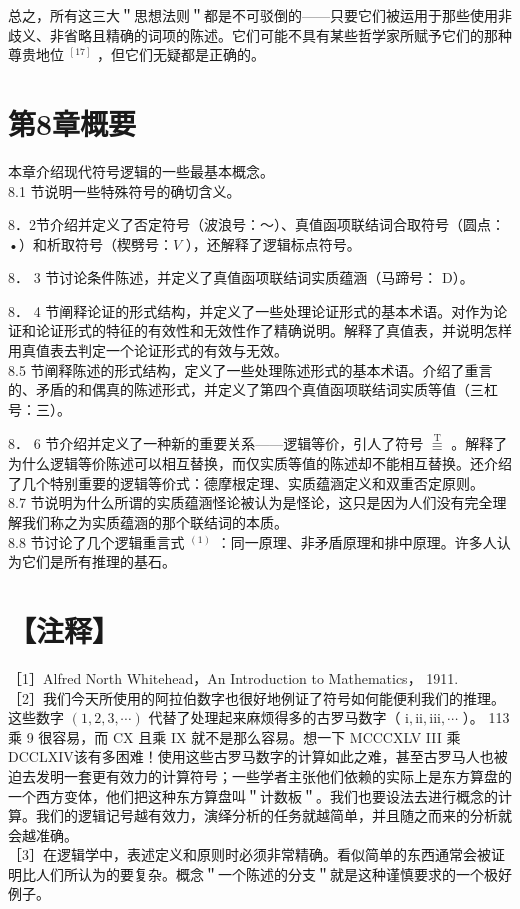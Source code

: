 总之，所有这三大＂思想法则＂都是不可驳倒的——只要它们被运用于那些使用非歧义、非省略且精确的词项的陈述。它们可能不具有某些哲学家所赋予它们的那种尊贵地位 ${ }^{[17]}$ ，但它们无疑都是正确的。

\section*{第8章概要}
本章介绍现代符号逻辑的一些最基本概念。\\
8.1 节说明一些特殊符号的确切含义。

8．2节介绍并定义了否定符号（波浪号：～）、真值函项联结词合取符号（圆点：•）和析取符号（楔劈号：$V$ ），还解释了逻辑标点符号。

8． 3 节讨论条件陈述，并定义了真值函项联结词实质蕴涵（马蹄号： D）。

8． 4 节阐释论证的形式结构，并定义了一些处理论证形式的基本术语。对作为论证和论证形式的特征的有效性和无效性作了精确说明。解释了真值表，并说明怎样用真值表去判定一个论证形式的有效与无效。\\
8.5 节阐释陈述的形式结构，定义了一些处理陈述形式的基本术语。介绍了重言的、矛盾的和偶真的陈述形式，并定义了第四个真值函项联结词实质等值（三杠号：三）。

8． 6 节介绍并定义了一种新的重要关系——逻辑等价，引人了符号 $\stackrel{\mathrm{T}}{\equiv}$ 。解释了为什么逻辑等价陈述可以相互替换，而仅实质等值的陈述却不能相互替换。还介绍了几个特别重要的逻辑等价式：德摩根定理、实质蕴涵定义和双重否定原则。\\
8.7 节说明为什么所谓的实质蕴涵怪论被认为是怪论，这只是因为人们没有完全理解我们称之为实质蕴涵的那个联结词的本质。\\
8.8 节讨论了几个逻辑重言式 ${ }^{(1)}$ ：同一原理、非矛盾原理和排中原理。许多人认为它们是所有推理的基石。

\section*{【注释】}
［1］Alfred North Whitehead，An Introduction to Mathematics， 1911.\\
［2］我们今天所使用的阿拉伯数字也很好地例证了符号如何能便利我们的推理。这些数字 $(1,2,3, \cdots)$ 代替了处理起来麻烦得多的古罗马数字（ $\mathrm{i}, \mathrm{ii}, \mathrm{iii}, \cdots$ ）。 113 乘 9 很容易，而 CX 且乘 IX 就不是那么容易。想一下 MCCCXLV III 乘 DCCLXIV该有多困难！使用这些古罗马数字的计算如此之难，甚至古罗马人也被迫去发明一套更有效力的计算符号；一些学者主张他们依赖的实际上是东方算盘的一个西方变体，他们把这种东方算盘叫＂计数板＂。我们也要设法去进行概念的计算。我们的逻辑记号越有效力，演绎分析的任务就越简单，并且随之而来的分析就会越准确。\\
［3］在逻辑学中，表述定义和原则时必须非常精确。看似简单的东西通常会被证明比人们所认为的要复杂。概念＂一个陈述的分支＂就是这种谨慎要求的一个极好例子。

